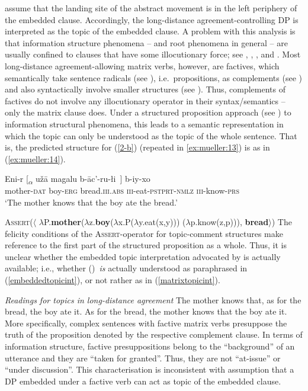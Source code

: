 \documentclass[output=paper
,modfonts
,nonflat]{langsci/langscibook}
\begin{document}
\citet{PolinskyPotsdam:01} assume that the landing site of the
abstract movement is in the left periphery of the embedded
	clause. Accordingly, the long-distance agreement-controlling DP is
	interpreted as the topic of the embedded clause. A problem with this
	analysis is that information structure phenomena -- and root phenomena
	in general -- are usually confined to clauses that have some
	illocutionary force; see \citet{HooperThompson:73},
	\citet{Ebertetal08}, \citet{Krifkainprep}, and \citet{Maticetal14}. Most long-distance agreement-allowing
	matrix verbs, however, are factives, which semantically take sentence
	radicals (see \citealt{Stenius67}), i.e.~propositions, as complements (see \citealt{Krifka04})
	and also syntactically involve smaller
	structures (see \citealt{deCubaUrogdi10}). Thus, complements of
	factives do not involve any illocutionary operator in their
	syntax/semantics -- only the matrix clause does. Under a structured
	proposition approach  (see \citealt{Krifka92}) to information structural
	phenomena, this leads to a semantic representation in which the topic
	can only be understood as the topic of the whole sentence. That is,
	the predicted structure for (\ref{2-b})  (repeated in
	\ref{ex:mueller:13}) is as in (\ref{ex:mueller:14}).
	
	
	\ea\label{ex:mueller:13}
	\gll    Eni-r [\textsubscript{{$\alpha$}} u\v{z}\={a} \label{2d-b}magalu b-\={a}c'-ru-\l i~] b-iy-xo \\
	mother-{\scshape dat} {} boy-{\scshape erg} bread.{\scshape iii.abs} {\scshape iii}-eat-{\scshape pstprt-nmlz} {\scshape iii}-know-{\scshape prs} \\
	\glt      `The mother knows that the boy ate the bread.'
	\z
	
	\ea\label{ex:mueller:14} {\scshape Assert}($\langle$ $\lambda$P.{\bfseries mother}($\lambda$z.{\bfseries boy}($\lambda$x.P($\lambda$y.eat(x,y))) ($\lambda$p.know(z,p))), {\bfseries bread}$\rangle$)\z
	The felicity conditions of the {\scshape Assert}-operator for topic-comment structures\linebreak
	make reference to the first part of the structured
	proposition as a whole. Thus, it is unclear whether the embedded topic interpretation
	advocated by \cite{PolinskyPotsdam:01}  is actually available;
	i.e.,  whether (\LLast)\ {\itshape is} actually understood as paraphrased in (\ref{embeddedtopicint}), or not rather as in (\ref{matrixtopicint}).
	
	\ea\label{ex:mueller:15} \textit{Readings for topics in long-distance agreement}
	\ea \label{embeddedtopicint}The mother knows that, as for the bread, the boy ate it.
	\ex \label{matrixtopicint}As for the bread, the mother knows that the boy ate it.
	\z
	\z
	More specifically, complex sentences with factive matrix verbs
	presuppose the truth of the proposition denoted by the respective
	complement clause. In terms of information structure, factive
	presuppositions belong to the ``background'' of an utterance and they
	are ``taken for granted''. Thus, they are not ``at-issue'' or ``under
	discussion''. This characterisation is inconsistent with
	 assumption that a DP embedded under a factive verb
	can act as topic of the embedded clause.
	
\end{document}
